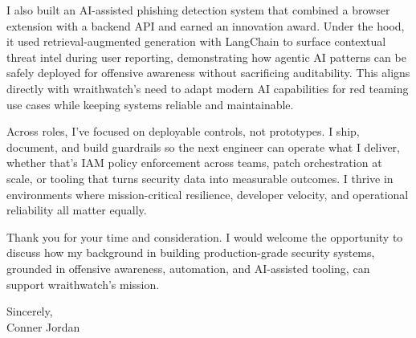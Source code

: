 \documentclass[letterpaper,11pt]{article}
\begin{document}
\vspace{16pt}

I also built an AI-assisted phishing detection system that combined a browser extension with a backend API and earned an innovation award. Under the hood, it used retrieval-augmented generation with LangChain to surface contextual threat intel during user reporting, demonstrating how agentic AI patterns can be safely deployed for offensive awareness without sacrificing auditability. This aligns directly with wraithwatch’s need to adapt modern AI capabilities for red teaming use cases while keeping systems reliable and maintainable.

\vspace{16pt}

Across roles, I’ve focused on deployable controls, not prototypes. I ship, document, and build guardrails so the next engineer can operate what I deliver, whether that’s IAM policy enforcement across teams, patch orchestration at scale, or tooling that turns security data into measurable outcomes. I thrive in environments where mission-critical resilience, developer velocity, and operational reliability all matter equally.

\vspace{16pt}

Thank you for your time and consideration. I would welcome the opportunity to discuss how my background in building production-grade security systems, grounded in offensive awareness, automation, and AI-assisted tooling, can support wraithwatch’s mission.

\vspace{16pt}

Sincerely,\\
Conner Jordan
\end{document}
